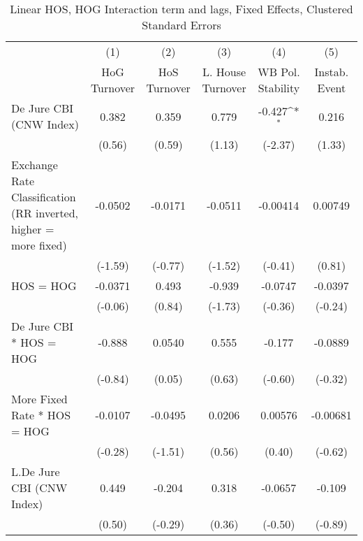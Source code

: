 {
\def\sym#1{\ifmmode^{#1}\else\(^{#1}\)\fi}
\begin{longtable}{l*{5}{c}}
\caption{Linear HOS, HOG Interaction term and lags, Fixed Effects, Clustered Standard Errors \label{hoshogintlagsDJ}}\\
\hline\hline\endfirsthead\hline\endhead\hline\endfoot\endlastfoot
                &\multicolumn{1}{c}{(1)}&\multicolumn{1}{c}{(2)}&\multicolumn{1}{c}{(3)}&\multicolumn{1}{c}{(4)}&\multicolumn{1}{c}{(5)}\\
                &\multicolumn{1}{c}{HoG Turnover}&\multicolumn{1}{c}{HoS Turnover}&\multicolumn{1}{c}{L. House Turnover}&\multicolumn{1}{c}{WB Pol. Stability}&\multicolumn{1}{c}{Instab. Event}\\
\hline
De Jure CBI (CNW Index)&    0.382         &    0.359         &    0.779         &   -0.427\sym{*}  &    0.216         \\
                &   (0.56)         &   (0.59)         &   (1.13)         &  (-2.37)         &   (1.33)         \\
[1em]
Exchange Rate Classification (RR inverted, higher = more fixed)&  -0.0502         &  -0.0171         &  -0.0511         & -0.00414         &  0.00749         \\
                &  (-1.59)         &  (-0.77)         &  (-1.52)         &  (-0.41)         &   (0.81)         \\
[1em]
HOS = HOG       &  -0.0371         &    0.493         &   -0.939         &  -0.0747         &  -0.0397         \\
                &  (-0.06)         &   (0.84)         &  (-1.73)         &  (-0.36)         &  (-0.24)         \\
[1em]
De Jure CBI * HOS = HOG&   -0.888         &   0.0540         &    0.555         &   -0.177         &  -0.0889         \\
                &  (-0.84)         &   (0.05)         &   (0.63)         &  (-0.60)         &  (-0.32)         \\
[1em]
More Fixed Rate * HOS = HOG&  -0.0107         &  -0.0495         &   0.0206         &  0.00576         & -0.00681         \\
                &  (-0.28)         &  (-1.51)         &   (0.56)         &   (0.40)         &  (-0.62)         \\
[1em]
L.De Jure CBI (CNW Index)&    0.449         &   -0.204         &    0.318         &  -0.0657         &   -0.109         \\
                &   (0.50)         &  (-0.29)         &   (0.36)         &  (-0.50)         &  (-0.89)         \\

\end{longtable}}
